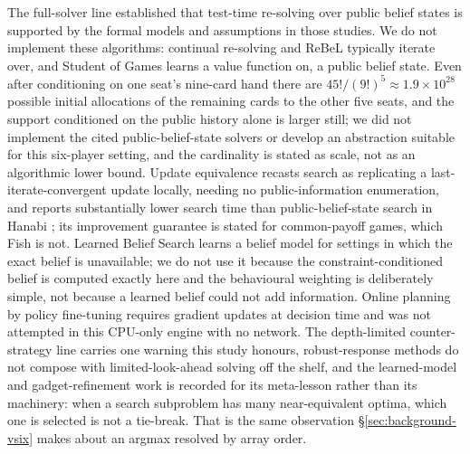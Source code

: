 The full-solver line \cite{moravcik2017deepstack,brown2020rebel,schmid2023sog} established that
test-time re-solving over public belief states is supported by the formal models and assumptions in
those studies. We do not implement these algorithms: continual re-solving and ReBeL typically
iterate over, and Student of Games learns a value function on, a public belief state. Even after
conditioning on one seat's nine-card hand there are $45!/(9!)^5 \approx 1.9 \times 10^{28}$
possible initial allocations of the remaining cards to the other five seats, and the support
conditioned on the public history alone is larger still; we did not implement the cited
public-belief-state solvers or develop an abstraction suitable for this six-player setting, and
the cardinality is stated as scale, not as an algorithmic lower bound. Update equivalence recasts search as replicating a last-iterate-convergent update locally,
needing no public-information enumeration, and reports substantially lower search time than
public-belief-state search in Hanabi \cite{sokota2024updateequivalence}; its improvement guarantee
is stated for common-payoff games, which Fish is not. Learned Belief Search \cite{hu2021lbs} learns
a belief model for settings in which the exact belief is unavailable; we do not use it because the
constraint-conditioned belief is computed exactly here and the behavioural weighting is deliberately
simple, not because a learned belief could not add information. Online planning by policy
fine-tuning \cite{fickinger2021rlfinetuning} requires gradient updates at decision time and was not
attempted in this CPU-only engine with no network. The depth-limited counter-strategy line
\cite{milec2021cdr,milec2025abd} carries one warning this study honours, robust-response methods
do not compose with limited-look-ahead solving off the shelf, and the learned-model and
gadget-refinement work \cite{kubicek2025lamir,kubicek2026refinements} is recorded for its
meta-lesson rather than its machinery: when a search subproblem has many near-equivalent optima,
which one is selected is not a tie-break. That is the same observation \S\ref{sec:background-vsix}
makes about an argmax resolved by array order.

